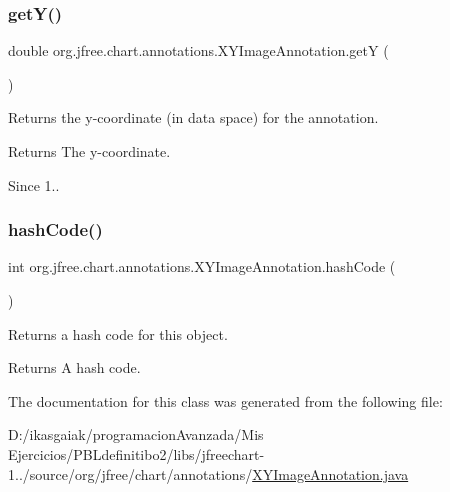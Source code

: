 \subsubsection{\texorpdfstring{get\+Y()}{getY()}}
{\footnotesize\ttfamily double org.\+jfree.\+chart.\+annotations.\+X\+Y\+Image\+Annotation.\+getY (\begin{DoxyParamCaption}{ }\end{DoxyParamCaption})}

Returns the y-\/coordinate (in data space) for the annotation.

\begin{DoxyReturn}{Returns}
The y-\/coordinate.
\end{DoxyReturn}
\begin{DoxySince}{Since}
1.. 
\end{DoxySince}
\mbox{\label{classorg_1_1jfree_1_1chart_1_1annotations_1_1_x_y_image_annotation_acf32ed3da18593fd2d5871c0bfd1ca7b}} 
\subsubsection{\texorpdfstring{hash\+Code()}{hashCode()}}
{\footnotesize\ttfamily int org.\+jfree.\+chart.\+annotations.\+X\+Y\+Image\+Annotation.\+hash\+Code (\begin{DoxyParamCaption}{ }\end{DoxyParamCaption})}

Returns a hash code for this object.

\begin{DoxyReturn}{Returns}
A hash code. 
\end{DoxyReturn}


The documentation for this class was generated from the following file\+:\begin{DoxyCompactItemize}
\item 
D\+:/ikasgaiak/programacion\+Avanzada/\+Mis Ejercicios/\+P\+B\+Ldefinitibo2/libs/jfreechart-\/1../source/org/jfree/chart/annotations/\mbox{\hyperlink{_x_y_image_annotation_8java}{X\+Y\+Image\+Annotation.\+java}}\end{DoxyCompactItemize}

